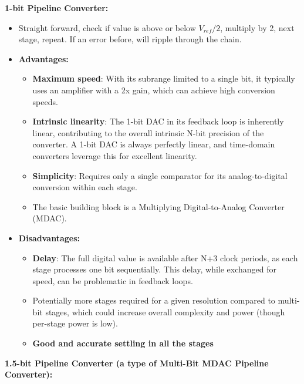 \documentclass[
  a4paper,
]{article}
\providecommand{\tightlist}{%
  \setlength{\itemsep}{0pt}\setlength{\parskip}{0pt}}
\begin{document}
\begin{enumerate}
  \textbf{1-bit Pipeline Converter:}

  \begin{itemize}
  \tightlist
  \item
    Straight forward, check if value is above or below \(V_{ref}/2\),
    multiply by 2, next stage, repeat. If an error before, will ripple
    through the chain.
  \item
    \textbf{Advantages:}

    \begin{itemize}
    \tightlist
    \item
      \textbf{Maximum speed}: With its subrange limited to a single bit,
      it typically uses an amplifier with a 2x gain, which can achieve
      high conversion speeds.
    \item
      \textbf{Intrinsic linearity}: The 1-bit DAC in its feedback loop
      is inherently linear, contributing to the overall intrinsic N-bit
      precision of the converter. A 1-bit DAC is always perfectly
      linear, and time-domain converters leverage this for excellent
      linearity.
    \item
      \textbf{Simplicity}: Requires only a single comparator for its
      analog-to-digital conversion within each stage.
    \item
      The basic building block is a Multiplying Digital-to-Analog
      Converter (MDAC).
    \end{itemize}
  \item
    \textbf{Disadvantages:}

    \begin{itemize}
    \tightlist
    \item
      \textbf{Delay}: The full digital value is available after N+3
      clock periods, as each stage processes one bit sequentially. This
      delay, while exchanged for speed, can be problematic in feedback
      loops.
    \item
      Potentially more stages required for a given resolution compared
      to multi-bit stages, which could increase overall complexity and
      power (though per-stage power is low).
    \item
      \textbf{Good and accurate settling in all the stages}
    \end{itemize}
  \end{itemize}

  \textbf{1.5-bit Pipeline Converter (a type of Multi-Bit MDAC Pipeline
  Converter):}


\end{enumerate}
\end{document}
